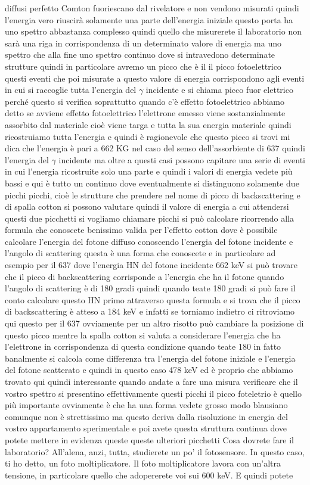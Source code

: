 {diffusi perfetto Comton fuoriescano dal rivelatore e non vendono misurati quindi l'energia vero riuscirà solamente una parte dell'energia iniziale questo porta ha uno spettro abbastanza complesso quindi quello che misurerete il laboratorio non sarà una riga in corrispondenza di un determinato valore di energia ma uno spettro che alla fine uno spettro continuo dove si intravedono determinate strutture quindi in particolare avremo un picco che è il il picco fotoelettrico questi eventi che poi misurate a questo valore di energia corrispondono agli eventi in cui si raccoglie tutta l'energia del $\gamma$ incidente e si chiama picco fuor elettrico perché questo si verifica soprattutto quando c'è effetto fotoelettrico abbiamo detto se avviene effetto fotoelettrico l'elettrone emesso viene sostanzialmente assorbito dal materiale cioè viene targa e tutta la sua energia materiale quindi ricostruiamo tutta l'energia e quindi è ragionevole che questo picco si trovi mi dica che l'energia è pari a 662 KG nel caso del senso dell'assorbiente di 637 quindi l'energia del $\gamma$ incidente ma oltre a questi casi possono capitare una serie di eventi in cui l'energia ricostruite solo una parte e quindi i valori di energia vedete più bassi e qui è tutto un continuo dove eventualmente si distinguono solamente due picchi picchi, cioè le strutture che prendere nel nome di picco di backscattering e di spalla cotton si possono valutare quindi il valore di energia a cui attendersi questi due picchetti si vogliamo chiamare picchi si può calcolare ricorrendo alla formula che conoscete benissimo valida per l'effetto cotton dove è possibile calcolare l'energia del fotone diffuso conoscendo l'energia del fotone incidente e l'angolo di scattering questa è una forma che conoscete e in particolare ad esempio per il 637 dove l'energia HN del fotone incidente 662 keV si può trovare che il picco di backscattering corrisponde a l'energia che ha il fotone quando l'angolo di scattering è di 180 gradi quindi quando teate 180 gradi si può fare il conto calcolare questo HN primo attraverso questa formula e si trova che il picco di backscattering è atteso a 184 keV e infatti se torniamo indietro ci ritroviamo qui questo per il 637 ovviamente per un altro risotto può cambiare la posizione di questo picco mentre la spalla cotton si valuta a considerare l'energia che ha l'elettrone in corrispondenza di questa condizione quando teate 180 in fatto banalmente si calcola come differenza tra l'energia del fotone iniziale e l'energia del fotone scatterato e quindi in questo caso 478 keV ed è proprio che abbiamo trovato qui quindi interessante quando andate a fare una misura verificare che il vostro spettro si presentino effettivamente questi picchi il picco foteletrio è quello più importante ovviamente è che ha una forma vedete grosso modo blausiano comunque non è strettissimo ma questo deriva dalla risoluzione in energia del vostro appartamento sperimentale e poi avete questa struttura continua dove potete mettere in evidenza queste queste ulteriori picchetti Cosa dovrete fare il laboratorio? All'alena, anzi, tutta, studierete un po' il fotosensore. In questo caso, ti ho detto, un foto moltiplicatore. Il foto moltiplicatore lavora con un'altra tensione, in particolare quello che adopererete voi sui 600 keV. E quindi potete }
